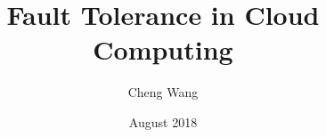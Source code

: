 \documentclass[phd,12pt]{hkuthesis}
\title{Fault Tolerance in Cloud Computing}
\author{Cheng Wang}
\date{August 2018}
\begin{document}
\begin{frontmatter}
	\abstract[200]		%
	\titlepage
	\dedication 		%
	\declaration
	\acknowledgements	%
	\tableofcontents
	\listoffigures		%
	\listoftables		%
\end{frontmatter}

\begin{chapters}
	
	
	
\end{chapters}

\begin{appendices}
	
	
\end{appendices}

\begin{backmatter}
	\printbibliography[heading=bibintoc,title=References]
\end{backmatter}
\end{document}
